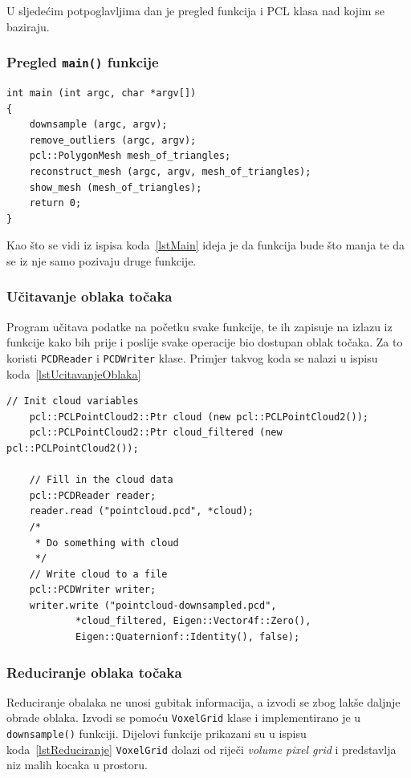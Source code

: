 U sljedećim potpoglavljima dan je pregled funkcija i PCL klasa nad kojim
se baziraju.

\subsubsection{Pregled \texttt{main()} funkcije} %
\label{ssub:Pregled main funkcije}
\begin{lstlisting}[label=lstMain,caption={Izvorni kod
\texttt{main() funkcije} }]
int main (int argc, char *argv[])
{
    downsample (argc, argv);
    remove_outliers (argc, argv);
    pcl::PolygonMesh mesh_of_triangles;
    reconstruct_mesh (argc, argv, mesh_of_triangles);
    show_mesh (mesh_of_triangles);
    return 0;
}
\end{lstlisting}
Kao što se vidi iz ispisa koda~\ref{lstMain} ideja je da funkcija bude
što manja te da se iz nje samo pozivaju druge funkcije.


\subsubsection{Učitavanje oblaka točaka} %
\label{ssub:Učitavanje oblaka točaka}
Program učitava podatke na početku svake funkcije, te ih zapisuje na
izlazu iz funkcije kako bih prije i poslije svake operacije bio dostupan
oblak točaka. Za to koristi \texttt{PCDReader} i \texttt{PCDWriter} klase.
Primjer takvog koda se nalazi u ispisu koda~\ref{lstUcitavanjeOblaka}

\begin{lstlisting}[label=lstUcitavanjeOblaka, caption={Primjer izvornog
koda za učitavanje oblaka točaka}]
    // Init cloud variables 
    pcl::PCLPointCloud2::Ptr cloud (new pcl::PCLPointCloud2());
    pcl::PCLPointCloud2::Ptr cloud_filtered (new pcl::PCLPointCloud2());

    // Fill in the cloud data
    pcl::PCDReader reader;
    reader.read ("pointcloud.pcd", *cloud);
    /* 
     * Do something with cloud
     */
    // Write cloud to a file
    pcl::PCDWriter writer;
    writer.write ("pointcloud-downsampled.pcd",
            *cloud_filtered, Eigen::Vector4f::Zero(),
            Eigen::Quaternionf::Identity(), false);
\end{lstlisting}


\subsubsection{Reduciranje oblaka točaka} %
\label{ssub:Reduciranje oblaka točaka}
Reduciranje obalaka ne unosi gubitak informacija, a izvodi se zbog lakše
daljnje obrade oblaka. Izvodi se pomoću \texttt{VoxelGrid} klase i
implementirano je u \texttt{downsample()} funkciji. Dijelovi funkcije
prikazani su u ispisu koda~\ref{lstReduciranje}
\texttt{VoxelGrid} dolazi od riječi \textit{volume pixel grid} i
predstavlja niz malih kocaka u prostoru.

